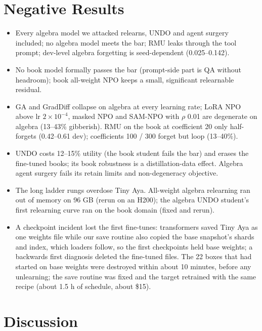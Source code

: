 \documentclass[10pt,twocolumn,letterpaper]{article}
\begin{document}
\section{Negative Results}

\begin{itemize}
\item Every algebra model we attacked relearns, UNDO and agent surgery included; no algebra model meets the bar; RMU leaks
through the tool prompt; dev-level algebra forgetting is seed-dependent (0.025--0.142).
\item No book model formally passes the bar (prompt-side part is QA without headroom); book all-weight NPO keeps a small,
significant relearnable residual.
\item GA and GradDiff collapse on algebra at every learning rate; LoRA NPO above lr $2\times10^{-4}$, masked NPO and
SAM-NPO with $\rho$ 0.01 are degenerate on algebra (13--43\% gibberish). RMU on the book at coefficient 20 only
half-forgets (0.42--0.61 dev); coefficients 100 / 300 forget but loop (13--40\%).
\item UNDO costs 12--15\% utility (the book student fails the bar) and erases the fine-tuned books; its book robustness is a
distillation-data effect. Algebra agent surgery fails its retain limits and non-degeneracy objective.
\item The long ladder rungs overdose Tiny Aya. All-weight algebra relearning ran out of memory on
96 GB (rerun on an H200); the algebra UNDO student's first relearning curve ran on the book domain (fixed and rerun).
\item A checkpoint incident lost the first fine-tunes: transformers saved Tiny Aya as one weights file while our save
routine also copied the base snapshot's shards and index, which loaders follow, so the first checkpoints held base weights;
a backwards first diagnosis deleted the fine-tuned files. The 22 boxes that had started on base weights were destroyed
within about 10 minutes, before any unlearning; the save routine was fixed and the target retrained with the same recipe
(about 1.5 h of schedule, about \$15).
\end{itemize}

\section{Discussion}
\end{document}
